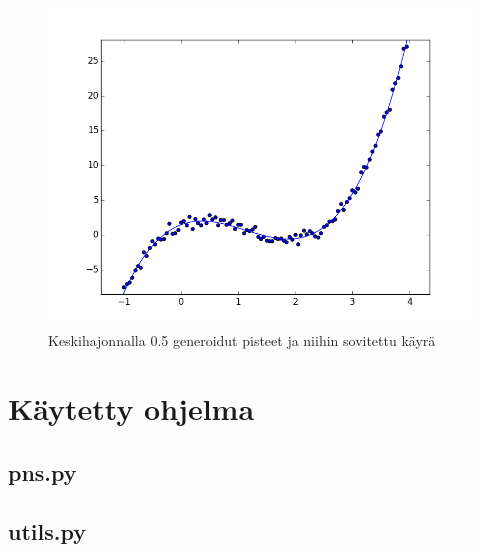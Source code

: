 \documentclass[12pt,a4paper,titlepage]{article}
\begin{document}
\begin{figure}
\centering
\includegraphics[width=\textwidth]{python/keskihajonta05.png}
\caption{Keskihajonnalla 0.5 generoidut pisteet ja niihin sovitettu käyrä}
\label{keskihajonta05}
\end{figure}


\newpage

 
\appendix
\newpage
\section{Käytetty ohjelma} \label{koodi}
\subsection{pns.py} \label{pns}

\newpage
\subsection{utils.py} \label{utils}

\end{document}
